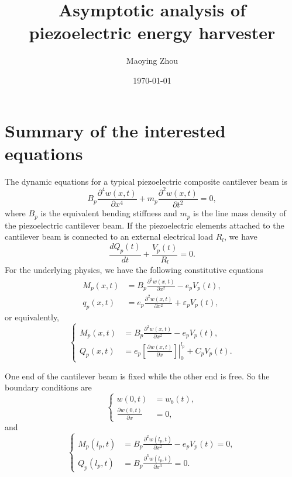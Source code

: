 \documentclass{article}
\title{Asymptotic analysis of piezoelectric energy harvester}
\author{Maoying Zhou}
\date{\today}
\begin{document}
\maketitle

\section{Summary of the interested equations}

The dynamic equations for a typical piezoelectric composite cantilever beam is 
\begin{equation}
    B_p \frac{\partial^4 w(x,t)}{\partial x^4} + m_p \frac{\partial^2 w(x,t)}{\partial t^2} = 0,
\end{equation}
where $B_p$ is the equivalent bending stiffness and $m_p$ is the line mass density of the piezoelectric cantilever beam. If the piezoelectric elements attached to the cantilever beam is connected to an external electrical load $R_l$, we have
\begin{equation}
    \frac{d Q_p(t)}{d t} + \frac{V_p(t)}{R_l} = 0.
\end{equation}
For the underlying physics, we have the following constitutive equations
\begin{equation}
    \begin{aligned}
        M_p(x,t) &= B_p \frac{\partial^2 w(x,t)}{\partial x^2} - e_p V_p(t), \\
        q_p(x,t) &= e_p \frac{\partial^2 w(x,t)}{\partial x^2} + \varepsilon_p V_p(t),
    \end{aligned}
\end{equation}
or equivalently,
\begin{equation}
    \left\{\begin{aligned}
        M_p(x,t) &= B_p \frac{\partial^2 w(x,t)}{\partial x^2} - e_p V_p(t), \\
        Q_p(x,t) &= e_p \left.\left[ \frac{\partial w(x,t)}{\partial x} \right]\right|_0^{l_p} + C_p V_p(t).
    \end{aligned}\right.
\end{equation}

One end of the cantilever beam is fixed while the other end is free. So the boundary conditions are
\begin{equation}
    \left\{\begin{aligned}
        w(0,t) &= w_b(t), \\
        \frac{\partial w(0,t)}{\partial x} &= 0,
    \end{aligned}\right.
\end{equation}
and
\begin{equation}
    \left\{\begin{aligned}
        M_p(l_p,t) &= B_p \frac{\partial^2 w(l_p,t)}{\partial x^2} - e_p V_p(t) = 0, \\
        Q_p(l_p,t) &= B_p \frac{\partial^3 w(l_p,t)}{\partial x^3} = 0.
    \end{aligned}\right.
\end{equation}
\end{document}
